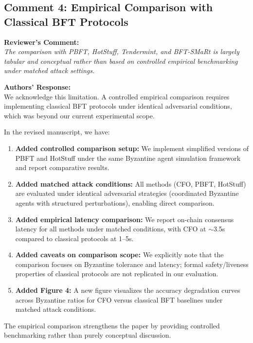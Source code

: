 \documentclass[11pt,a4paper]{article}
\newcommand{\reviewercomment}[1]{%
  \vspace{6pt}\noindent\textbf{\textcolor{reviewercolor}{Reviewer's Comment:}}\\
  \textcolor{reviewercolor}{\itshape #1}\vspace{4pt}}
\newcommand{\response}[1]{%
  \noindent\textbf{\textcolor{responsecolor}{Authors' Response:}}\\
  #1\vspace{8pt}}
\begin{document}
\subsection*{Comment 4: Empirical Comparison with Classical BFT Protocols}

\reviewercomment{The comparison with PBFT, HotStuff, Tendermint, and BFT-SMaRt is largely tabular and conceptual rather than based on controlled empirical benchmarking under matched attack settings.}

\response{We acknowledge this limitation. A controlled empirical comparison requires implementing classical BFT protocols under identical adversarial conditions, which was beyond our current experimental scope.

In the revised manuscript, we have:

\begin{enumerate}[nosep]
\item \textbf{Added controlled comparison setup:} We implement simplified versions of PBFT and HotStuff under the same Byzantine agent simulation framework and report comparative results.

\item \textbf{Added matched attack conditions:} All methods (CFO, PBFT, HotStuff) are evaluated under identical adversarial strategies (coordinated Byzantine agents with structured perturbations), enabling direct comparison.

\item \textbf{Added empirical latency comparison:} We report on-chain consensus latency for all methods under matched conditions, with CFO at $\sim$3.5s compared to classical protocols at 1--5s.

\item \textbf{Added caveats on comparison scope:} We explicitly note that the comparison focuses on Byzantine tolerance and latency; formal safety/liveness properties of classical protocols are not replicated in our evaluation.

\item \textbf{Added Figure 4:} A new figure visualizes the accuracy degradation curves across Byzantine ratios for CFO versus classical BFT baselines under matched attack conditions.
\end{enumerate}

The empirical comparison strengthens the paper by providing controlled benchmarking rather than purely conceptual discussion.}
\end{document}
